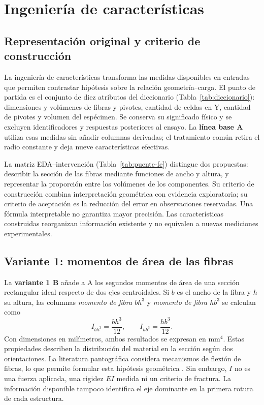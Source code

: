 \section{Ingeniería de características}
\label{sec:fe}

\subsection{Representación original y criterio de construcción}
La ingeniería de características transforma las medidas disponibles en entradas que permiten contrastar hipótesis sobre la relación geometría--carga. El punto de partida es el conjunto de diez atributos del diccionario (Tabla~\ref{tab:diccionario}): dimensiones y volúmenes de fibras y pivotes, cantidad de celdas en Y, cantidad de pivotes y volumen del espécimen. Se conserva su significado físico y se excluyen identificadores y respuestas posteriores al ensayo. La \textbf{línea base A} utiliza esas medidas sin añadir columnas derivadas; el tratamiento común retira el radio constante y deja nueve características efectivas.

La matriz EDA--intervención (Tabla~\ref{tab:puente-fe}) distingue dos propuestas: describir la sección de las fibras mediante funciones de ancho y altura, y representar la proporción entre los volúmenes de los componentes. Su criterio de construcción combina interpretación geométrica con evidencia exploratoria; su criterio de aceptación es la reducción del error en observaciones reservadas. Una fórmula interpretable no garantiza mayor precisión. Las características construidas reorganizan información existente y no equivalen a nuevas mediciones experimentales.

\subsection{Variante 1: momentos de área de las fibras}
La \textbf{variante 1 B} añade a A los segundos momentos de área de una sección rectangular ideal respecto de dos ejes centroidales. Si $b$ es el ancho de la fibra y $h$ su altura, las columnas \emph{momento de fibra $bh^3$} y \emph{momento de fibra $hb^3$} se calculan como
\begin{equation}
I_{bh^3}=\frac{bh^3}{12},\qquad
I_{hb^3}=\frac{hb^3}{12}.
\label{eq:momentos}
\end{equation}
Con dimensiones en milímetros, ambos resultados se expresan en mm$^4$. Estas propiedades describen la distribución del material en la sección según dos orientaciones. La literatura pantográfica considera mecanismos de flexión de fibras, lo que permite formular esta hipótesis geométrica \cite{turco2017,turco2019}. Sin embargo, $I$ no es una fuerza aplicada, una rigidez $EI$ medida ni un criterio de fractura. La información disponible tampoco identifica el eje dominante en la primera rotura de cada estructura.

